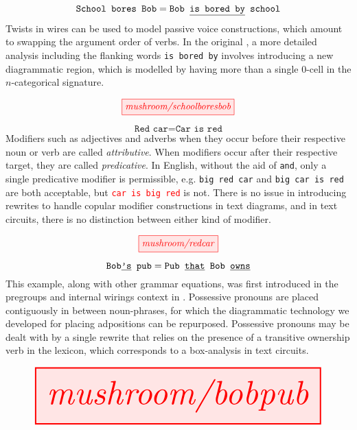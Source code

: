 \begin{myboxB}
\begin{example}\label{ex:pass}
\[\texttt{School bores Bob} = \texttt{Bob \underline{is bored by} school}\]
Twists in wires can be used to model passive voice constructions, which amount to swapping the argument order of verbs. In the original \citep{wang-mascianicaDistillingTextCircuits2023a}, a more detailed analysis including the flanking words \texttt{\texttt{is} bored \texttt{by}} involves introducing a new diagrammatic region, which is modelled by having more than a single 0-cell in the $n$-categorical signature.
\end{example}
\[\tikzfig{mushroom/schoolboresbob}\]
\end{myboxB}

\begin{myboxB}
\begin{example}\label{ex:copula}
\[\texttt{Red car} = \texttt{Car is red}\]
Modifiers such as adjectives and adverbs when they occur before their respective noun or verb are called \emph{attributive}. When modifiers occur after their respective target, they are called \emph{predicative}. In English, without the aid of \texttt{and}, only a single predicative modifier is permissible, e.g. \texttt{big red car} and \texttt{big car is red} are both acceptable, but \textcolor{red}{\texttt{car is big red}} is not. There is no issue in introducing rewrites to handle copular modifier constructions in text diagrams, and in text circuits, there is no distinction between either kind of modifier.
\end{example}
\[\tikzfig{mushroom/redcar}\]
\end{myboxB}

\begin{myboxB}
\begin{example}\label{ex:posspron}
\[\texttt{Bob\underline{'s} pub} = \texttt{Pub \underline{that} Bob \underline{owns}}\]
This example, along with other grammar equations, was first introduced in the pregroups and internal wirings context in \citep{coeckeGrammarEquations2021a}. Possessive pronouns are placed contiguously in between noun-phrases, for which the diagrammatic technology we developed for placing adpositions can be repurposed. Possessive pronouns may be dealt with by a single rewrite that relies on the presence of a transitive ownership verb in the lexicon, which corresponds to a box-analysis in text circuits.
\end{example}
\[\resizebox{\textwidth}{!}{\tikzfig{mushroom/bobpub}}\]
\end{myboxB}

